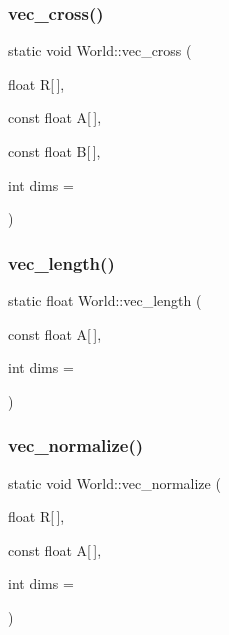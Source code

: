 \mbox{\label{classWorld_a9b029d34daf647dee298b726de427f94}} 
\subsubsection{\texorpdfstring{vec\+\_\+cross()}{vec\_cross()}}
{\footnotesize\ttfamily static void World\+::vec\+\_\+cross (\begin{DoxyParamCaption}\item[{float}]{R\mbox{[}$\,$\mbox{]},  }\item[{const float}]{A\mbox{[}$\,$\mbox{]},  }\item[{const float}]{B\mbox{[}$\,$\mbox{]},  }\item[{int}]{dims = {} }\end{DoxyParamCaption})\hspace{0.3cm}{\ttfamily [static]}}

\mbox{\label{classWorld_ab14c775fe092d0e2fc89bcaa5fe0a165}} 
\subsubsection{\texorpdfstring{vec\+\_\+length()}{vec\_length()}}
{\footnotesize\ttfamily static float World\+::vec\+\_\+length (\begin{DoxyParamCaption}\item[{const float}]{A\mbox{[}$\,$\mbox{]},  }\item[{int}]{dims = {} }\end{DoxyParamCaption})\hspace{0.3cm}{\ttfamily [static]}}

\mbox{\label{classWorld_af1d0bfb9010d194010fb6abc505d40cf}} 
\subsubsection{\texorpdfstring{vec\+\_\+normalize()}{vec\_normalize()}}
{\footnotesize\ttfamily static void World\+::vec\+\_\+normalize (\begin{DoxyParamCaption}\item[{float}]{R\mbox{[}$\,$\mbox{]},  }\item[{const float}]{A\mbox{[}$\,$\mbox{]},  }\item[{int}]{dims = {} }\end{DoxyParamCaption})\hspace{0.3cm}{\ttfamily [static]}}

